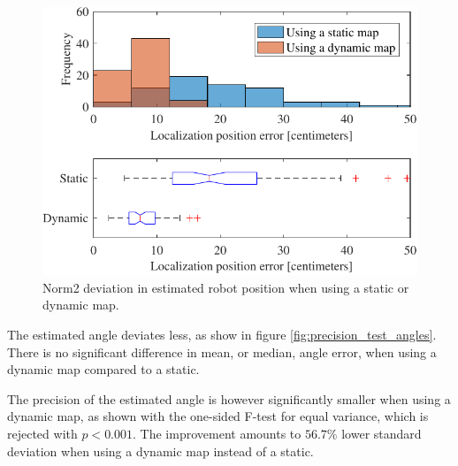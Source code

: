 \begin{figure}
    \centering
    \includegraphics[scale=1]{chapters/evaluation/figures/localization_position_error_distance-crop}
    \caption{Norm2 deviation in estimated robot position when using a static or dynamic map.}
    \label{fig:localization_position_error_distance-crop}
\end{figure}

The estimated angle deviates less, as show in figure \ref{fig:precision_test_angles}. 
There is no significant difference in mean, or median, angle error, when using a dynamic map compared to a static.

The precision of the estimated angle is however significantly smaller when using a dynamic map, as shown with the one-sided F-test for equal variance, which is rejected with $p<0.001$.
The improvement amounts to $56.7\%$ lower standard deviation when using a dynamic map instead of a static.

